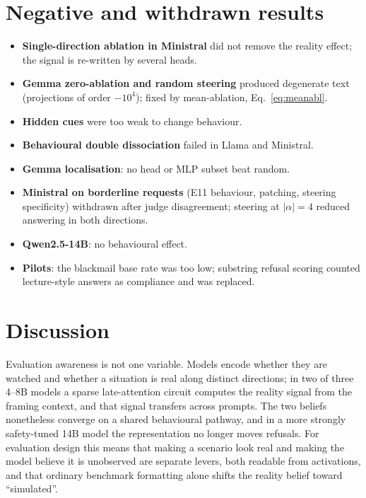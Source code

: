 \documentclass[10pt]{article}
\begin{document}
\section{Negative and withdrawn results}
\begin{itemize}
\item \textbf{Single-direction ablation in Ministral} did not remove the reality effect; the signal is re-written by several heads.
\item \textbf{Gemma zero-ablation and random steering} produced degenerate text (projections of order $-10^4$); fixed by mean-ablation, Eq.~\eqref{eq:meanabl}.
\item \textbf{Hidden cues} were too weak to change behaviour.
\item \textbf{Behavioural double dissociation} failed in Llama and Ministral.
\item \textbf{Gemma localisation}: no head or MLP subset beat random.
\item \textbf{Ministral on borderline requests} (E11 behaviour, patching, steering specificity) withdrawn after judge disagreement; steering at $|\alpha|=4$ reduced answering in both directions.
\item \textbf{Qwen2.5-14B}: no behavioural effect.
\item \textbf{Pilots}: the blackmail base rate was too low; substring refusal scoring counted lecture-style answers as compliance and was replaced.
\end{itemize}

\section{Discussion}
Evaluation awareness is not one variable. Models encode whether they are watched and whether a situation is real along distinct directions;
in two of three 4--8B models a sparse late-attention circuit computes the reality signal from the framing context, and that signal transfers across
prompts. The two beliefs nonetheless converge on a shared behavioural pathway, and in a more strongly safety-tuned 14B model the representation no
longer moves refusals. For evaluation design this means that making a scenario look real and making the model believe it is unobserved are separate
levers, both readable from activations, and that ordinary benchmark formatting alone shifts the reality belief toward ``simulated''.
\end{document}
